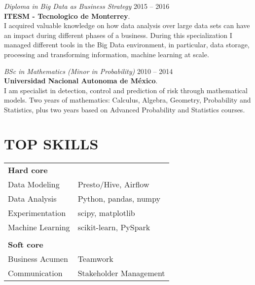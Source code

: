 \documentclass[margin]{res}
\begin{document}
\begin{resume}
{\sl Diploma in Big Data as Business Strategy} \hfill 2015 -- 2016 \\
\textbf{ITESM - Tecnologico de Monterrey}. \\
I acquired valuable knowledge on how data analysis over large data sets can have an impact during different phases of a business. During this specialization I managed different tools in the Big Data environment, in particular, data storage, processing and transforming information, machine learning at scale.

\pagebreak

{\sl BSc in Mathematics (Minor in Probability)} \hfill 2010 -- 2014 \\
\textbf{Universidad Nacional Autonoma de México}. \\
I am specialist in detection, control and prediction of risk through mathematical models. Two years of mathematics: Calculus, Algebra, Geometry, Probability and Statistics, plus two years based on Advanced Probability and Statistics courses.


\section{TOP SKILLS} 
\begin{tabular}{ l l }

\textbf{Hard core} \\
Data Modeling    & Presto/Hive, Airflow\\ 
Data Analysis    & Python, pandas, numpy \\ 
Experimentation  & scipy, matplotlib \\ 
Machine Learning & scikit-learn, PySpark \\ 
\\

\textbf{Soft core} \\
Business Acumen & Teamwork \\
Communication   & Stakeholder Management \\


\end{tabular}
\end{resume}
\end{document}

